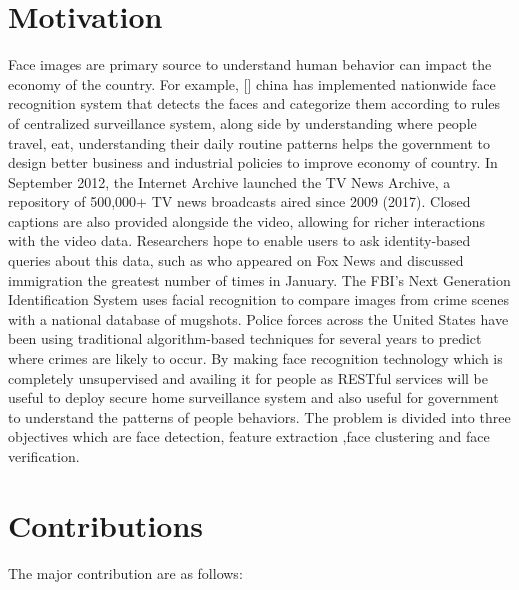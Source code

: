 \documentclass[a4paper,12pt, twoside]{NITKReport}
\begin{document}
	\section{Motivation}
	\label{moti}
	Face images are primary source to understand human behavior can impact the economy of the country. For example, [\cite{3}] china has implemented nationwide face recognition system that detects the faces and categorize them according to rules of centralized surveillance system, along side by understanding where people travel, eat, understanding their daily routine patterns helps the government to design better business and industrial policies to improve economy of country. 
In September 2012, the Internet Archive launched the TV News Archive, a repository of 500,000+ TV news broadcasts aired since 2009 (2017). Closed captions are also provided alongside the video, allowing for richer interactions with the video data. Researchers hope to enable users to ask identity-based queries about this data, such as who appeared on Fox News and discussed immigration the greatest number of times in January. The FBI’s Next Generation Identification System uses facial recognition to compare images from crime scenes with a national database of mugshots. Police forces across the United States have been using traditional algorithm-based techniques for several years to predict where crimes are likely to occur. By making face recognition technology which is completely unsupervised and availing it for people as RESTful services will be useful to deploy secure home surveillance system and also useful for government to understand the patterns of people behaviors. The problem is divided into three objectives which are face detection, feature extraction ,face clustering and face verification.

	
\section{Contributions}
\label{contri}
 The major contribution are as follows:
  
\end{document}
